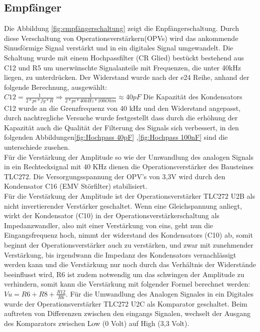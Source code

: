 \subsection{Empfänger}
Die Abbildung \ref{fig:empfängerschaltung} zeigt die Enpfängerschaltung. Durch diese Verschaltung von Operationsverstärkern(OPVs) wird das ankommende Sinusförmige Signal verstärkt und in ein digitales Signal umgewandelt. Die Schaltung wurde mit einem Hochpassfilter (CR Glied) bestückt bestehend aus C12 und R5 um unerwünschte Signalanteile mit Frequenzen, die unter 40kHz liegen, zu unterdrücken. Der Widerstand wurde nach der e24 Reihe, anhand der folgende Berechnung, ausgewählt:
\onehalfspacing \\
\(\displaystyle C12=\frac{1}{2*pi*fg*R}\Rightarrow\frac{1}{2*pi*40kHz*100 Ohm}\approx40pF \)
\singlespacing
Die Kapazität des Kondensators C12 wurde an die Grenzfrequenz von 40 kHz und den Widerstand angepasst, durch nachtregliche Versuche wurde festgestellt dass durch die erhöhung der Kapazität auch die Qualität der Filterung des Signals sich verbessert, in den folgenden Abbildungen\ref{fig:Hochpass 40pF} ,\ref{fig:Hochpass 100nF} sind die unterschiede zusehen. \\
Für die Verstärkung der Amplitude so wie der Umwandlung des analogen Signals in ein Rechtecksignal mit 40 KHz  dienen die Operationsverstärker des Bausteines TLC272. Die Versorgungsspannung der OPV's von 3,3V wird durch den Kondensator C16 (EMV Störfilter) stabilisiert.\\
Für die Verstärkung der Amplitude ist der Operationsverstärker TLC272 U2B als  nicht invertierender Verstärker geschaltet.
Wenn eine Gleichspannung anliegt, wirkt der Kondensator (C10) in der Operationsverstärkerschaltung als Impedanzwandler, also mit einer Verstärkung von eins, geht nun die Eingangsfrequenz hoch, nimmt der widerstand des Kondensators (C10) ab, somit beginnt der Operationsverstärker auch zu verstärken, und zwar mit zunehmender Verstärkung, bis irgendwann die Impedanz des Kondensators vernachlässigt werden kann und die Verstärkung nur noch durch das Verhältnis der Widerstände beeinflusst wird, R6 ist zudem notwendig um das schwingen der Amplitude zu verhindern, somit kann die Verstärkung mit folgender Formel berechnet werden:
\onehalfspacing \\
\(\displaystyle Vu=R6+R8+\frac{R12}{R6} .\) 
\singlespacing
Für die Umwandlung des Analogen Signales in ein Digitales wurde der Operationsverstärker TLC272 U2C als Komparator geschaltet. Beim auftreten von Differenzen zwischen den eingangs Signalen, wechselt der Ausgang des Komparators zwischen Low (0 Volt) auf High (3,3 Volt).

